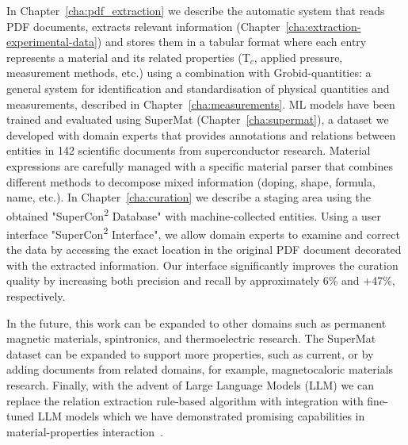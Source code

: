 \documentclass[a4paper,11pt]{report}
\newcommand{\tc}{T$_{c}$}
\begin{document}
In Chapter~\ref{cha:pdf_extraction} we describe the automatic system that reads PDF documents, extracts relevant information (Chapter~\ref{cha:extraction-experimental-data}) and stores them in a tabular format where each entry represents a material and its related properties (\tc, applied pressure, measurement methods, etc.) using a combination with Grobid-quantities: a general system for identification and standardisation of physical quantities and measurements, described in Chapter~\ref{cha:measurements}.
ML models have been trained and evaluated using SuperMat (Chapter~\ref{cha:supermat}), a dataset we developed with domain experts that provides annotations and relations between entities in 142 scientific documents from superconductor research.
Material expressions are carefully managed with a specific material parser that combines different methods to decompose mixed information (doping, shape, formula, name, etc.). 
In Chapter~\ref{cha:curation} we describe a staging area using the obtained "SuperCon\textsuperscript{2} Database" with machine-collected entities. Using a user interface "SuperCon\textsuperscript{2} Interface", we allow domain experts to examine and correct the data by accessing the exact location in the original PDF document decorated with the extracted information. 
Our interface significantly improves the curation quality by increasing both precision and recall by approximately 6\% and +47\%, respectively.

In the future, this work can be expanded to other domains such as permanent magnetic materials, spintronics, and thermoelectric research. 
The SuperMat dataset can be expanded to support more properties, such as current, or by adding documents from related domains, for example, magnetocaloric materials research. 
Finally, with the advent of Large Language Models (LLM) we can replace the relation extraction rule-based algorithm with integration with fine-tuned LLM models which we have demonstrated promising capabilities in material-properties interaction~\cite{foppiano2024mining}. 


\newpage

{}



\newpage

{}

\end{document}
